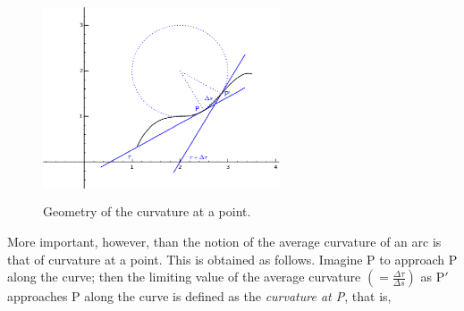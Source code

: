 \begin{figure}[h!]
\begin{minipage}{\textwidth}
\begin{center}
\includegraphics[height=6cm,width=7cm]{curvature-point2.eps}
\end{center}
\end{minipage}
\caption{Geometry of the curvature at a point.}
\label{fig:curvature-point}
\end{figure}


More important, however, than the notion of the average 
curvature of an arc is that of curvature at a point. 
This is obtained as follows. Imagine P to approach P 
along the curve; then the limiting value of the average 
curvature $\left( = \frac{\Delta \tau}{\Delta s} \right)$ 
as P$'$ approaches P along the curve is defined as the 
{\it curvature at P}, that is,

